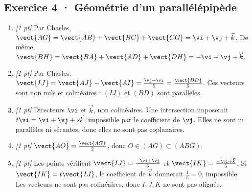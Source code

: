 \subsection*{Exercice 4 · Géométrie d'un parallélépipède}\begin{enumerate}

\item \textit{[1 pt]} Par Chasles, $\vect{AG}=\vect{AB}+\vect{BC}+\vect{CG}=\vi +\vj +\vec k$. De même, $\vect{BH}=\vect{BA}+\vect{AD}+\vect{DH}=-\vi +\vj +\vec k$.

\item \textit{[1 pt]} Par Chasles, $\vect{IJ}=\vect{AJ}-\vect{AI}=\frac{\vj -\vi }{5}=\frac{\vect{BD}}{5}$. Ces vecteurs sont non nuls et colinéaires : $(IJ)$ et $(BD)$ sont parallèles.

\item \textit{[1 pt]} Directeurs $\vi $ et $\vec k$, non colinéaires. Une intersection imposerait $t\vi =\vi +\vj +s\vec k$, impossible par le coefficient de $\vj $. Elles ne sont ni parallèles ni sécantes, donc elles ne sont pas coplanaires.

\item \textit{[1 pt]} $\vect{AO}=\frac{\vect{AG}}{2}$, donc $O\in(AG)\subset(ABG)$.

\item \textit{[1 pt]} Les points vérifient $\vect{IJ}=\frac{-\vi +\vj }{5}$ et $\vect{IK}=\frac{-\vi +\vec k}{5}$. Si $\vect{IK}=t\vect{IJ}$, le coefficient de $\vec k$ donnerait $\frac{1}{5}=0$, impossible. Les vecteurs ne sont pas colinéaires, donc $I,J,K$ ne sont pas alignés.

\end{enumerate}

\fi

\fi

